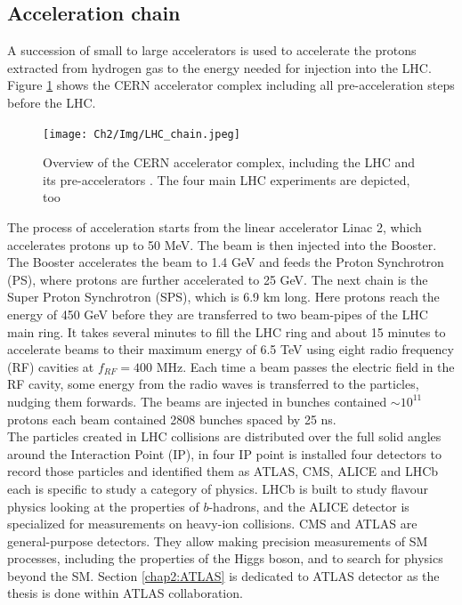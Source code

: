 \subsection{Acceleration chain}
\label{chap2:LHC:chain}
A succession of small to large accelerators is used to accelerate the protons extracted from hydrogen gas to the energy needed for injection into the LHC. Figure \ref{fig:chap2:LHC:chain} shows the CERN accelerator complex including all pre-acceleration steps before the LHC.
\begin{figure}[htbp]
    \centering
    \texttt{[image: Ch2/Img/LHC\_chain.jpeg]}
    \caption{Overview of the CERN accelerator complex, including the LHC and its pre-accelerators \cite{LHC_chain}. The four main LHC experiments are depicted, too}
    \label{fig:chap2:LHC:chain}
\end{figure}
The process of acceleration starts from the linear accelerator Linac 2, which accelerates protons up to 50 MeV. The beam is then injected into the Booster. The Booster accelerates the beam to 1.4 GeV and feeds the Proton Synchrotron (PS), where protons are further accelerated to 25 GeV. The next chain is the Super Proton Synchrotron (SPS), which is 6.9 km long. Here protons reach the energy of 450 GeV before they are transferred to two beam-pipes of the LHC main ring. It takes several minutes to fill the LHC ring and about 15 minutes to accelerate beams to their maximum energy of 6.5 TeV using eight radio frequency (RF) cavities at $f_{RF} = 400$ MHz. Each time a beam passes the electric field in the RF cavity, some energy from the radio waves is transferred to the particles, nudging them forwards. The beams are injected in bunches contained $\sim 10^{11}$ protons each beam contained 2808 bunches spaced by 25 ns. \\
The particles created in LHC collisions are distributed over the full solid angles around the Interaction Point (IP), in four IP point is installed four detectors to record those particles and identified them as ATLAS, CMS, ALICE and LHCb each is specific to study a category of physics. LHCb is built to study flavour physics looking at the properties of $b$-hadrons, and the ALICE detector is specialized for measurements on heavy-ion collisions. CMS and ATLAS are general-purpose detectors. They allow making precision measurements of SM processes, including the properties of the Higgs boson, and to search for physics beyond the SM. Section \ref{chap2:ATLAS} is dedicated to ATLAS detector as the thesis is done within ATLAS collaboration.

